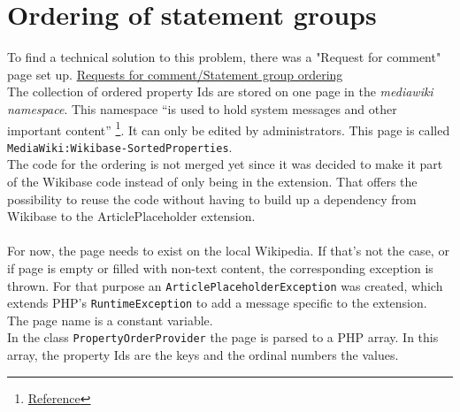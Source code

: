 \section{Ordering of statement groups}

To find a technical solution to this problem, there was a "Request for comment" page set up. \href{https://www.mediawiki.org/wiki/Requests_for_comment/Statement_group_ordering}{Requests for comment/Statement group ordering} \\

The collection of ordered property Ids are stored on one page in the \textit{mediawiki namespace}. This namespace ``is used to hold system messages and other important content'' \footnote{\href{https://www.mediawiki.org/wiki/Help:Namespaces\#MediaWiki}{Reference}}. It can only be edited by administrators. This page is called \texttt{MediaWiki:Wikibase-SortedProperties}. \\
The code for the ordering is not merged yet since it was decided to make it part of the Wikibase code instead of only being in the extension. That offers the possibility to reuse the code without having to build up a dependency from Wikibase to the ArticlePlaceholder extension. \\
\\
For now, the page needs to exist on the local Wikipedia. If that's not the case, or if page is empty or filled with non-text content, the corresponding exception is thrown. For that purpose an \texttt{ArticlePlaceholderException} was created, which extends PHP's \texttt{RuntimeException} to add a message specific to the extension.\\
The page name is a constant variable. \\
In the class \texttt{PropertyOrderProvider} the page is parsed to a PHP array. In this array, the property Ids are the keys and the ordinal numbers the values. \\

